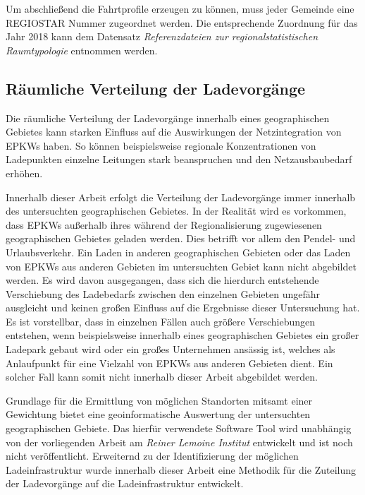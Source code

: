 Um abschließend die Fahrtprofile erzeugen zu können, muss jeder Gemeinde eine \gls{REGIOSTAR} Nummer zugeordnet werden.
Die entsprechende Zuordnung für das Jahr \num{2018} kann dem Datensatz \textit{Referenzdateien zur regionalstatistischen Raumtypologie} \cite[][Stand: ]{BMVIa2020} entnommen werden.


\subsection{Räumliche Verteilung der Ladevorgänge}\label{chap:theo_distribution}

Die räumliche Verteilung der Ladevorgänge innerhalb eines geographischen Gebietes kann starken Einfluss auf die Auswirkungen der Netzintegration von \glspl{EPKW} haben.
So können beispielsweise regionale Konzentrationen von Ladepunkten einzelne Leitungen stark beanspruchen und den Netzausbaubedarf erhöhen.\medskip

Innerhalb dieser Arbeit erfolgt die Verteilung der Ladevorgänge immer innerhalb des untersuchten geographischen Gebietes.
In der Realität wird es vorkommen, dass \glspl{EPKW} außerhalb ihres während der Regionalisierung zugewiesenen geographischen Gebietes geladen werden.
Dies betrifft vor allem den Pendel- und Urlaubsverkehr.
Ein Laden in anderen geographischen Gebieten oder das Laden von \glspl{EPKW} aus anderen Gebieten im untersuchten Gebiet kann nicht abgebildet werden.
Es wird davon ausgegangen, dass sich die hierdurch entstehende Verschiebung des Ladebedarfs zwischen den einzelnen Gebieten ungefähr ausgleicht und keinen großen Einfluss auf die Ergebnisse dieser Untersuchung hat.
Es ist vorstellbar, dass in einzelnen Fällen auch größere Verschiebungen entstehen, wenn beispielsweise innerhalb eines geographischen Gebietes ein großer Ladepark gebaut wird oder ein großes Unternehmen ansässig ist, welches als Anlaufpunkt für eine Vielzahl von \glspl{EPKW} aus anderen Gebieten dient. 
Ein solcher Fall kann somit nicht innerhalb dieser Arbeit abgebildet werden.\medskip

Grundlage für die Ermittlung von möglichen Standorten mitsamt einer Gewichtung bietet eine geoinformatische Auswertung der untersuchten geographischen Gebiete.
Das hierfür verwendete Software Tool wird unabhängig von der vorliegenden Arbeit am \textit{Reiner Lemoine Institut} entwickelt und ist noch nicht veröffentlicht.
Erweiternd zu der Identifizierung der möglichen Ladeinfrastruktur wurde innerhalb dieser Arbeit eine Methodik für die Zuteilung der Ladevorgänge auf die Ladeinfrastruktur entwickelt.


